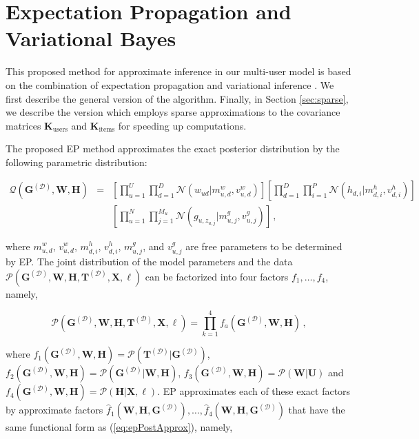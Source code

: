 \section{Expectation Propagation and Variational Bayes\label{sec:ep}}

This proposed method for approximate inference in our multi-user model is based on the combination of expectation propagation \cite{Minka2002,gerven2010a}
and variational inference \cite{stern2009}. We first describe the general version of the algorithm.
Finally, in Section \ref{sec:sparse}, we describe the version which employs sparse approximations to the covariance matrices $\mathbf{K}_\text{users}$
and $\mathbf{K}_\text{items}$ for speeding up computations.

The proposed EP method approximates the exact posterior distribution by the following parametric distribution:

\begin{eqnarray}
\mathcal{Q}(\mathbf{G}^{(\mathcal{D})},\mathbf{W},\mathbf{H}) & = & \left[\prod_{u=1}^{U}\prod_{d=1}^{D}\mathcal{N}(w_{ud}|m_{u,d}^{w},v_{u,d}^{w})\right]
\left[\prod_{d=1}^{D}\prod_{i=1}^{P} \mathcal{N}(h_{d,i}|m_{d,i}^h,v_{d,i}^{h})\right]\nonumber\\
& & \left[\prod_{u=1}^N \prod_{j=1}^{M_u} \mathcal{N}(g_{u,z_{u,j}}|m_{u,j}^g,v_{u,j}^g)\right]\,,\label{eq:epPostApprox}
\end{eqnarray}

where $m_{u,d}^w$, $v_{u,d}^w$, $m_{d,i}^h$, $v_{d,i}^h$,
$m_{u,j}^g$, and $v_{u,j}^g$ are free parameters to be determined by EP. 
The joint distribution of the model parameters and the data 
$\mathcal{P}(\mathbf{G}^{(\mathcal{D})},\mathbf{W},\mathbf{H},\mathbf{T}^{(\mathcal{D})},\mathbf{X},\ell)$ can be factorized
into four factors $f_1,\ldots,f_4$, namely,

\begin{equation}
\mathcal{P}(\mathbf{G}^{(\mathcal{D})},\mathbf{W},\mathbf{H},\mathbf{T}^{(\mathcal{D})},\mathbf{X},\ell) =
\prod_{k=1}^4 f_a(\mathbf{G}^{(\mathcal{D})},\mathbf{W},\mathbf{H})\,,
\end{equation}

where $f_1(\mathbf{G}^{(\mathcal{D})},\mathbf{W},\mathbf{H}) = \mathcal{P}(\mathbf{T}^{(\mathcal{D})}|\mathbf{G}^{(\mathcal{D})})$,
$f_2(\mathbf{G}^{(\mathcal{D})},\mathbf{W},\mathbf{H}) = \mathcal{P}(\mathbf{G}^{(\mathcal{D})}|\mathbf{W},\mathbf{H})$,
$f_3(\mathbf{G}^{(\mathcal{D})},\mathbf{W},\mathbf{H}) = \mathcal{P}(\mathbf{W}|\mathbf{U})$ and
$f_4(\mathbf{G}^{(\mathcal{D})},\mathbf{W},\mathbf{H}) = \mathcal{P}(\mathbf{H}|\mathbf{X},\ell)$.
EP approximates each of these exact factors by 
approximate factors $\hat{f}_{1}(\mathbf{W},\mathbf{H},\mathbf{G}^{(\mathcal{D})}),\ldots,\hat{f}_{4}(\mathbf{W},\mathbf{H},\mathbf{G}^{(\mathcal{D})})$
that have the same functional form as (\ref{eq:epPostApprox}), namely,

